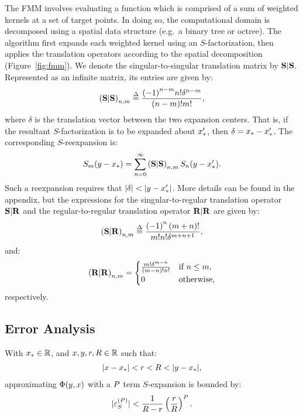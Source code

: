 The FMM involves evaluating a function which is comprised of a sum of
weighted kernels at a set of target points. In doing so, the
computational domain is decomposed using a spatial data structure
(e.g.\ a binary tree or octree). The algorithm first expands each
weighted kernel using an $S$-factorization, then applies the
translation operators according to the spatial decomposition
(Figure~\ref{fig:fmm}). We denote the singular-to-singular translation
matrix by $\bold{S}|\bold{S}$. Represented as an infinite matrix, its entries are
given by:
\begin{align}
  \label{eq:SSmat}
  \left(\bold{S}|\bold{S}\right)_{n,m} \overset{\Delta}{=} \frac{{(-1)}^{n-m} n! \delta^{n-m}}{(n-m)!m!},
\end{align}
where $\delta$ is the translation vector between the two expansion
centers. That is, if the resultant $S$-factorization is to be expanded
about ${x}_{*}'$, then $\delta = {x}_{*} - {x}_{*}'$. The corresponding
$S$-reexpansion is:
\begin{align}
  \label{eq:SSmat-reexpansion}
  S_m(y - {x}_{*}) = \sum_{n=0}^\infty \left(\bold{S}|\bold{S}\right)_{n,m} S_n(y - {x}_{*}').
\end{align}
Such a reexpansion requires that $\left|\delta\right| < \left|y -
  {x}_{*}'\right|$. More details can be found in the appendix, but the
expressions for the singular-to-regular translation operator $\bold{S}|\bold{R}$
and the regular-to-regular translation operator $\bold{R}|\bold{R}$ are given by:
\begin{align}
  \label{eq:SRmat}
  \left(\bold{S}|\bold{R}\right)_{n,m} \overset{\Delta}{=} {\left(-1\right)^n \left(m + n\right)! \over m! n! \delta^{m+n+1}},
\end{align}
and:
\begin{align}
  \label{eq:RRmat}
  \left(\bold{R}|\bold{R}\right)_{n,m} = \begin{cases}
    \frac{m! \delta^{m - n}}{(m - n)!n!} & \mbox{if } n \leq m, \\
    0 & \mbox{otherwise},
  \end{cases}
\end{align}
respectively.

\subsection*{Error Analysis}

\begin{lemma}\label{lemma:S-error}
  With ${x}_{*}\in\mathbb{R}$, and $x, y, r, R \in \mathbb{R}$ such that:
  \begin{align}
    \label{eq:S-error-condition}
    |x - {x}_{*}| < r < R < |y - {x}_{*}|,
  \end{align}
  approximating $\Phi(y, x)$ with a $P$ term $S$-expansion
  is bounded by:
  \begin{align*}
    |{\varepsilon}^{(P)}_{S}| < \frac{1}{R-r} \left(\frac{r}{R}\right)^P.
  \end{align*}
\end{lemma}

